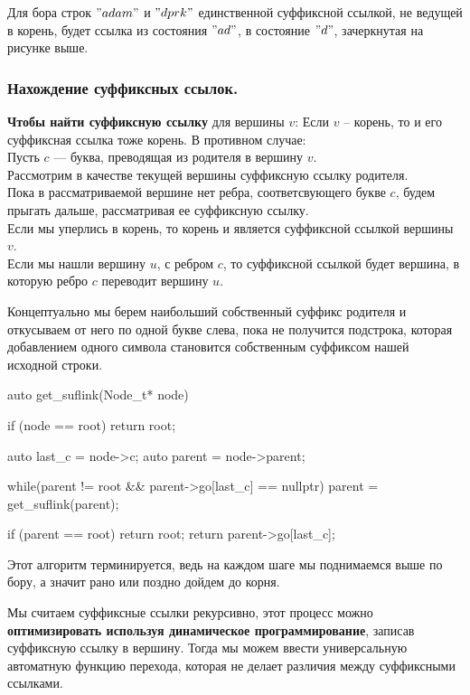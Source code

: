 \begin{example}
	Для бора строк $"adam"$ и $"dprk"$ единственной суффиксной ссылкой, не ведущей в корень, будет ссылка из состояния $"ad"$, в состояние $"d"$, зачеркнутая на рисунке выше.
\end{example}

\subsubsection{Нахождение суффиксных ссылок.}

\textbf{Чтобы найти суффиксную ссылку} для вершины $v$: 
Если $v$ -- корень, то и его суффиксная ссылка тоже корень.
В противном случае: \\
Пусть $c$ --- буква, преводящая из родителя в вершину $v$. \\
Рассмотрим в качестве текущей вершины суффиксную ссылку родителя. \\
Пока в рассматриваемой вершине нет ребра, соответсвующего букве $c$, будем прыгать дальше, рассматривая ее суффиксную ссылку. \\
Если мы уперлись в корень, то корень и является суффиксной ссылкой вершины $v$. \\
Если мы нашли вершину $u$, с ребром  $c$, то суффиксной ссылкой будет вершина, в которую ребро  $c$ переводит  вершину $u$.

Концептуально мы берем наибольший собственный суффикс родителя и откусываем от него по одной букве слева, пока не получится подстрока, которая добавлением одного символа становится собственным суффиксом нашей исходной строки.

\begin{listing}[language = C++]
    auto get_suflink(Node_t* node){
        
        if (node == root) return root;

        auto last_c = node->c;
        auto parent = node->parent;

        while(parent != root && parent->go[last_c] == nullptr){
            parent = get_suflink(parent);
        }

        if (parent == root) return root;
        return parent->go[last_c];
    }
\end{listing}

Этот алгоритм терминируется, ведь на каждом шаге мы поднимаемся выше по бору, а значит рано или поздно дойдем до корня.

Мы считаем суффиксные ссылки рекурсивно, этот процесс можно \textbf{оптимизировать используя динамическое программирование}, записав суффиксную ссылку в вершину. 
Тогда мы можем ввести универсальную автоматную функцию перехода, которая не делает различия между суффиксными ссылками.


